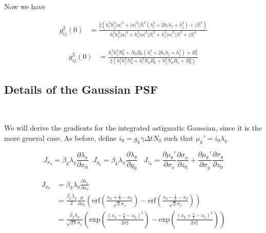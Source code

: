 Now we have

\begin{align*}
g^{2}_{ij}(0) &= \frac{\xi(h_{i}^{2}h_{j}^{2}\lvert\alpha\rvert^{4}+ \lvert\alpha\rvert^{2}\lvert\beta\rvert^{2}(h_{i}^{2} +  2 h_{i}h_{j} + h_{j}^{2})  + \lvert\beta\rvert^{4})}{h_{i}^{2}h_{j}^{2}\lvert\alpha\rvert^{4} + h_{i}^{2}\lvert\alpha\rvert^{2}\lvert\beta\rvert^{2} + h_{j}^{2}\lvert\alpha\rvert^{2}\lvert\beta\rvert^{2} +  \lvert\beta\rvert^{4}}
\end{align*}

\begin{align*}
g^{2}_{ij}(0) &= \frac{h_{i}^{2}h_{j}^{2}N_{0}^{2} + N_{0}B_{0}(h_{i}^{2} +  2 h_{i}h_{j} + h_{j}^{2}) + B_{0}^{2}}{\xi\left(h_{i}^{2}h_{j}^{2}N_{0}^{2} + h_{i}^{2}N_{0}B_{0} + h_{j}^{2}N_{0}B_{0} +  B_{0}^{2}\right)}
\end{align*}

\subsection{Details of the Gaussian PSF}\

We will derive the gradients for the integrated astigmatic Gaussian, since it is the more general case. As before, define $i_{0} = g_{k}\gamma\Delta t N_{0}$ such that $\mu_{k}' = i_{0}\lambda_{k}$

\begin{equation*}
J_{x_{0}} = \beta_{k}\lambda_{y}\frac{\partial \lambda_{x}}{\partial x_{0}} \;\; J_{y_{0}} = \beta_{k}\lambda_{x}\frac{\partial \lambda_{y}}{\partial y_{0}}\;\;\; J_{z_{0}}  = \frac{\partial \mu_{k}'}{\partial \sigma_{x}}\frac{\partial \sigma_{x}}{\partial z_{0}} + \frac{\partial \mu_{k}'}{\partial \sigma_{y}}\frac{\partial \sigma_{y}}{\partial z_{0}}
\end{equation*}

\begin{align*}
J_{x_{0}} &= \beta_{k}\lambda_{y}\frac{\partial \lambda_{x}}{\partial x_{0}} \\
&= \frac{\beta_{k}\lambda_{y}}{2}\frac{\partial}{\partial x_{0}}\left(\mathrm{erf}\left(\frac{x_{k}+\frac{1}{2}-x_{0}}{\sqrt{2}\sigma_{x}}\right) -\mathrm{erf}\left(\frac{x_{k}-\frac{1}{2}-x_{0}}{\sqrt{2}\sigma_{x}}\right)\right)\\
&= \frac{\beta_{k}\lambda_{y}}{\sqrt{2\pi}\sigma_{x}}\left(\mathrm{exp}\left(\frac{(x_{k}-\frac{1}{2}-x_{0})^{2}}{2\sigma_{x}^{2}}\right) -\mathrm{exp}\left(\frac{(x_{k}+\frac{1}{2}-x_{0})^{2}}{2\sigma_{x}^{2}}\right)\right)
\end{align*}

